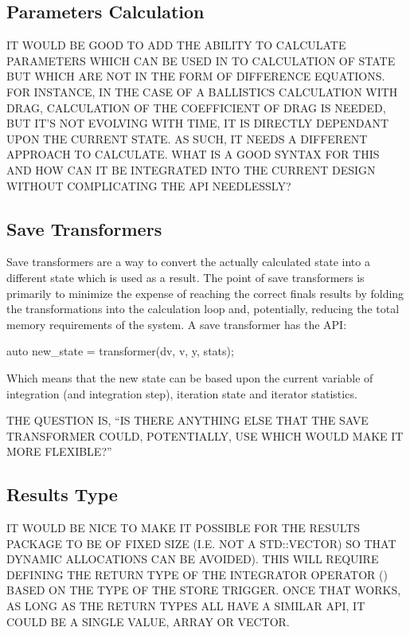 \documentclass[letterpaper,10pt]{book}
\begin{document}
      \subsection{Parameters Calculation}
	IT WOULD BE GOOD TO ADD THE ABILITY TO CALCULATE PARAMETERS WHICH CAN BE USED IN TO CALCULATION OF STATE BUT WHICH ARE NOT IN THE FORM OF DIFFERENCE EQUATIONS.  FOR INSTANCE, IN THE CASE OF A BALLISTICS CALCULATION WITH DRAG, CALCULATION OF THE COEFFICIENT OF DRAG IS NEEDED, BUT IT'S NOT EVOLVING WITH TIME, IT IS DIRECTLY DEPENDANT UPON THE CURRENT STATE.  AS SUCH, IT NEEDS A DIFFERENT APPROACH TO CALCULATE.  WHAT IS A GOOD SYNTAX FOR THIS AND HOW CAN IT BE INTEGRATED INTO THE CURRENT DESIGN WITHOUT COMPLICATING THE API NEEDLESSLY?
	
      \subsection{Save Transformers}
	Save transformers are a way to convert the actually calculated state into a different state which is used as a result.  The point of save transformers is primarily to minimize the expense of reaching the correct finals results by folding the transformations into the calculation loop and, potentially, reducing the total memory requirements of the system.  A save transformer has the API:
	\begin{epodecode}
	  auto new_state = transformer(dv, v, y, stats);
	\end{epodecode}
	Which means that the new state can be based upon the current variable of integration (and integration step), iteration state and iterator statistics.
	
	THE QUESTION IS, ``IS THERE ANYTHING ELSE THAT THE SAVE TRANSFORMER COULD, POTENTIALLY, USE WHICH WOULD MAKE IT MORE FLEXIBLE?''
	
      \subsection{Results Type}
      IT WOULD BE NICE TO MAKE IT POSSIBLE FOR THE RESULTS PACKAGE TO BE OF FIXED SIZE (I.E. NOT A STD::VECTOR) SO THAT DYNAMIC ALLOCATIONS CAN BE AVOIDED).  THIS WILL REQUIRE DEFINING THE RETURN TYPE OF THE INTEGRATOR OPERATOR () BASED ON THE TYPE OF THE STORE TRIGGER.  ONCE THAT WORKS, AS LONG AS THE RETURN TYPES ALL HAVE A SIMILAR API, IT COULD BE A SINGLE VALUE, ARRAY OR VECTOR.
      
      
\end{document}
